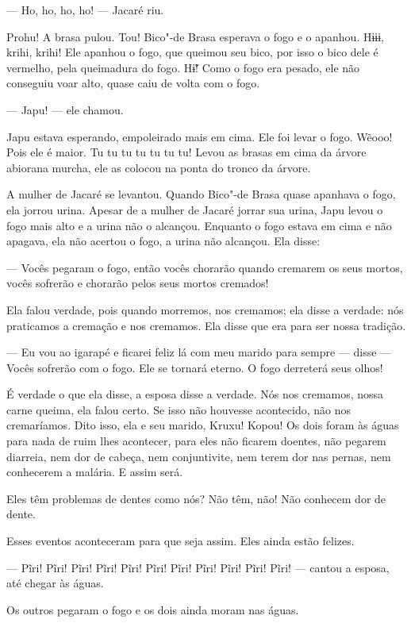 --- Ho, ho, ho, ho! --- Jacaré riu. 

Prohu! A brasa pulou. Tou! Bico"-de Brasa esperava o fogo e
o apanhou. Hɨɨɨ, krihi, krihi! Ele apanhou o fogo, que queimou seu
bico, por isso o bico dele é vermelho, pela queimadura do
fogo. Hɨ̃! Como o fogo era pesado, ele não conseguiu voar alto,
quase caiu de volta com o fogo. 

--- Japu! --- ele chamou.

Japu estava esperando, empoleirado mais em cima. Ele foi levar o fogo.
Wẽooo! Pois ele é maior. Tu tu tu tu tu tu tu! Levou as brasas em cima
da árvore abiorana murcha, ele as colocou na ponta do tronco da árvore. 

A mulher de Jacaré se levantou. Quando Bico"-de Brasa quase apanhava o
fogo, ela jorrou urina. Apesar de a mulher de Jacaré jorrar sua urina,
Japu levou o fogo mais alto e a urina não o alcançou. Enquanto
o fogo estava em cima e não apagava, ela não acertou o fogo, a urina não
alcançou. Ela disse:

--- Vocês pegaram o fogo, então vocês chorarão quando cremarem os seus
mortos, vocês sofrerão e chorarão pelos seus mortos cremados! 

Ela falou verdade, pois quando morremos, nos cremamos; ela disse a
verdade: nós praticamos a cremação e nos cremamos. Ela disse que era
para ser nossa tradição. 

--- Eu vou ao igarapé e ficarei feliz lá com meu marido para sempre ---
disse --- Vocês sofrerão com o fogo. Ele se tornará eterno. O fogo
derreterá seus olhos! 

É verdade o que ela disse, a esposa disse a verdade. Nós nos cremamos,
nossa carne queima, ela falou certo. Se isso não houvesse acontecido,
não nos cremaríamos. Dito isso, ela e seu marido, Kruxu! Kopou! Os dois
foram às águas para nada de ruim lhes acontecer, para eles não ficarem
doentes, não pegarem diarreia, nem dor de cabeça, nem conjuntivite, nem
terem dor nas pernas, nem conhecerem a malária. E assim será. 

Eles têm problemas de dentes como nós? Não têm, não! Não conhecem dor de
dente. 

Esses eventos aconteceram para que seja assim. Eles ainda estão
felizes. 

--- Pĩri! Pĩri! Pĩri! Pĩri! Pĩri! Pĩri! Pĩri! Pĩri! Pĩri! Pĩri! Pĩri!
--- cantou a esposa, até chegar às águas. 

Os outros pegaram o fogo e os dois ainda moram nas águas.